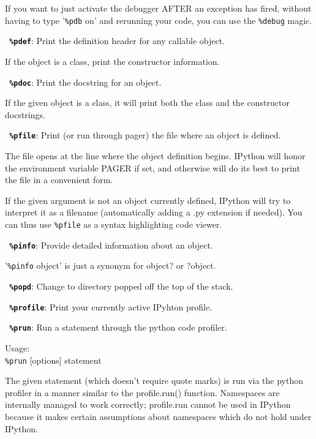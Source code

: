         If you want to just activate the debugger AFTER an exception has fired,
        without having to type '\texttt{\%pdb} on' and rerunning your code, you can use
        the \texttt{\%debug} magic.

\bigskip
\texttt{\textbf{ \%pdef}}:
	Print the definition header for any callable object.

        If the object is a class, print the constructor information.

\bigskip
\texttt{\textbf{ \%pdoc}}:
	Print the docstring for an object.

        If the given object is a class, it will print both the class and the
        constructor docstrings.

\bigskip
\texttt{\textbf{ \%pfile}}:
	Print (or run through pager) the file where an object is defined.

        The file opens at the line where the object definition begins. IPython
        will honor the environment variable PAGER if set, and otherwise will
        do its best to print the file in a convenient form.

        If the given argument is not an object currently defined, IPython will
        try to interpret it as a filename (automatically adding a .py extension
        if needed). You can thus use \texttt{\%pfile} as a syntax highlighting code
        viewer.

\bigskip
\texttt{\textbf{ \%pinfo}}:
	Provide detailed information about an object.

        '\texttt{\%pinfo} object' is just a synonym for object? or ?object.

\bigskip
\texttt{\textbf{ \%popd}}:
	Change to directory popped off the top of the stack.
        

\bigskip
\texttt{\textbf{ \%profile}}:
	Print your currently active IPyhton profile.

\bigskip
\texttt{\textbf{ \%prun}}:
	Run a statement through the python code profiler.

        Usage:\\
          \texttt{\%prun} [options] statement

        The given statement (which doesn't require quote marks) is run via the
        python profiler in a manner similar to the profile.run() function.
        Namespaces are internally managed to work correctly; profile.run
        cannot be used in IPython because it makes certain assumptions about
        namespaces which do not hold under IPython.


